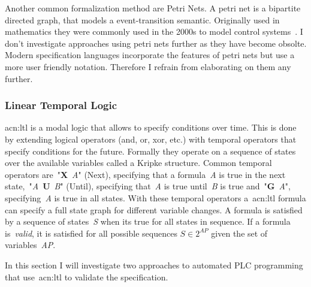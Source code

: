 Another common formalization method are Petri Nets.
A petri net is a bipartite directed graph, that models a event-transition semantic.
Originally used in mathematics they were commonly used in the 2000s to model control systems~\cite{Frey:2000:2, Frey:2000aa}.
I don't investigate approaches using petri nets further as they have become obsolte.
Modern specification languages incorporate the features of petri nets but use a more user friendly notation.
Therefore I refrain from elaborating on them any further.

\subsubsection{Linear Temporal Logic}
\label{sec:sub:ltl}

\acrfull{acn:ltl} is a modal logic that allows to specify conditions over time.
This is done by extending logical operators (and, or, xor, etc.) with temporal operators that specify conditions for the future.
Formally they operate on a sequence of states over the available variables called a Kripke structure.
Common temporal operators are~"\textbf{X}~\textit{A}" (Next), specifying that a formula~\textit{A} is true in the next state,~"\textit{A}~\textbf{U}~\textit{B}" (Until), specifying that~\textit{A} is true until~\textit{B} is true and~"\textbf{G}~\textit{A}", specifying~\textit{A} is true in all states.
With these temporal operators a~\acrfull{acn:ltl} formula can specify a full state graph for different variable changes.
A formula is satisfied by a sequence of states~\textit{S} when its true for all states in sequence.
If a formula is~\textit{valid}, it is satisfied for all possible sequences $ S\in 2^{AP} $ given the set of variables~\textit{AP}.

In this section I will investigate two approaches to automated PLC programming that use~\acrshort{acn:ltl} to validate the specification.

